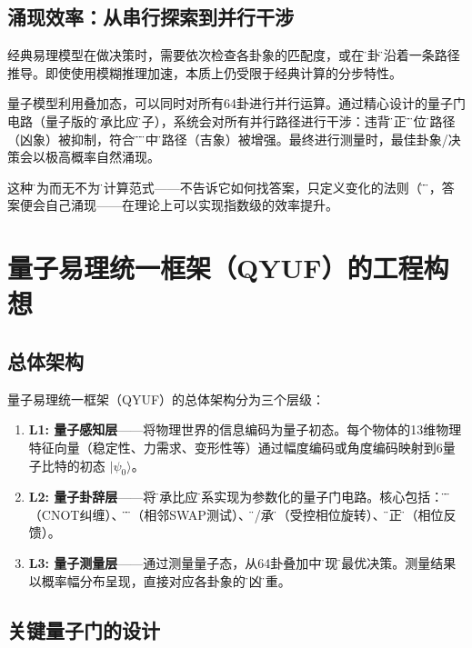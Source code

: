 \documentclass[twocolumn]{article}
\begin{document}
\subsection{涌现效率：从串行探索到并行干涉}

经典易理模型在做决策时，需要依次检查各卦象的匹配度，或在\"变卦\"时沿着一条路径推导。即使使用模糊推理加速，本质上仍受限于经典计算的分步特性。

量子模型利用叠加态，可以同时对所有64卦进行并行运算。通过精心设计的量子门电路（量子版的\"乘承比应\"算子），系统会对所有并行路径进行干涉：违背\"中正\"和\"当位\"的路径（凶象）被抑制，符合\"应\"和\"得中\"的路径（吉象）被增强。最终进行测量时，最佳卦象/决策会以极高概率自然涌现。

这种\"无为而无不为\"的计算范式——不告诉它如何找答案，只定义变化的法则（\"道\"），答案便会自己涌现——在理论上可以实现指数级的效率提升。

\section{量子易理统一框架（QYUF）的工程构想}

\subsection{总体架构}

量子易理统一框架（QYUF）的总体架构分为三个层级：

\begin{enumerate}
  \item \textbf{L1: 量子感知层}——将物理世界的信息编码为量子初态。每个物体的13维物理特征向量（稳定性、力需求、变形性等）通过幅度编码或角度编码映射到6量子比特的初态 $|\psi_0\rangle$。
  \item \textbf{L2: 量子卦辞层}——将\"乘承比应\"关系实现为参数化的量子门电路。核心包括：\"应\"门（CNOT纠缠）、\"比\"门（相邻SWAP测试）、\"乘/承\"门（受控相位旋转）、\"中正\"门（相位反馈）。
  \item \textbf{L3: 量子测量层}——通过测量量子态，从64卦叠加中\"涌现\"出最优决策。测量结果以概率幅分布呈现，直接对应各卦象的\"吉凶\"权重。
\end{enumerate}

\subsection{关键量子门的设计}
\end{document}

